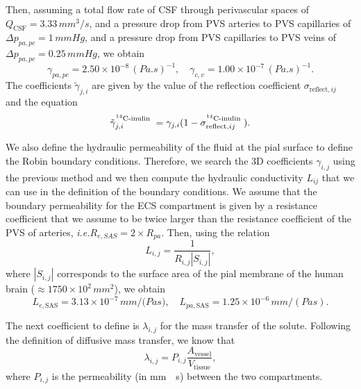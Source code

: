 \documentclass[10pt]{article}
\newcommand{\ie}{\emph{i.e.}\;}
\newcommand{\1}{^{(1)}}
\newcommand{\2}{^{(2)}}
\newcommand{\abs}[1]{\left\lvert#1\right\rvert}
\newcommand{\Cinulin}{$\prescript{14}{}{\text{C}}$-inulin }
\begin{document}
Then, assuming a total flow rate of CSF through perivascular spaces of  $Q_\text{CSF} = 3.33 \,\si{mm^3/s}$, and a pressure drop from PVS arteries to PVS capillaries of $\Delta p_{pa,pc} = 1 \, \si{mmHg}$, and a  pressure drop from PVS capillaries to PVS veins of $\Delta p_{pa,pc} = 0.25 \, \si{mmHg}$, we obtain 
\[
    \gamma_{pa,pc} = 2.50 \times 10^{-8}\, \si{(Pa.s)^{-1}},\quad \gamma_{c,v} = 1.00  \times 10^{-7}\, \si{(Pa.s)^{-1}}.
\]
The coefficients $\tilde \gamma_{j , i}$ are given by the value of the reflection coefficient $\sigma_{\text{reflect},ij}$ and the equation
\begin{equation}
    \tilde \gamma^\text{\Cinulin}_{j, i} =  \gamma_{j, i}(1-\sigma_{\text{reflect},ij}^\text{\Cinulin}).
    \label{eq:gamma-tilde}
\end{equation}

We also define the hydraulic permeability of the fluid at the pial surface to define the Robin boundary conditions. 
Therefore, we search the 3D coefficients $\gamma_{i,j}$ using the previous method and we then compute the hydraulic conductivity $L_{ij}$ that we can use in the definition of the boundary conditions. 
We assume that the boundary permeability for the ECS compartment is given by a resistance coefficient that we assume to be twice larger than the resistance coefficient of the PVS of arteries, \ie $R_{e,SAS} = 2 \times R_{pa}$. 
Then, using the relation
\[
L_{i,j} = \frac{1}{R_{i,j}\abs{S_{i,j}}},
\]
where $\abs{S_{i,j}}$ corresponds to the surface area of the pial membrane of the human brain ($\approx 1750 \times 10^2 \, \si{mm^2}$), we obtain
\[
L_{e,\text{SAS}} = 3.13 \times 10^{-7} \, \si{mm/(Pa s}),\quad L_{pa,\text{SAS}} = 1.25 \times 10^{-6} \, \si{mm/(Pa s)}.
\]

The next coefficient to define is $\lambda_{i, j}$ for the mass transfer of the solute. Following the definition of diffusive mass transfer, we know that 
\begin{equation}
    \lambda_{i, j} =  P_{i, j} \frac{A_\text{vessel}}{V_\text{tissue}},
\end{equation}
where $P_{i,j}$ is the permeability (in \si{mm \per \second}) between the two compartments.
\end{document}
